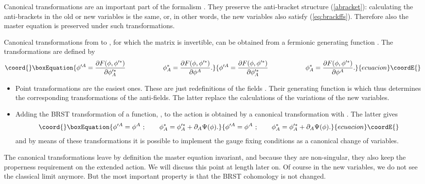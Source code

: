 \documentclass[a4paper,12pt]{article}
\begin{document}
Canonical transformations are an important part of the formalism
\cite{cano}.  They preserve the anti-bracket structure
(\ref{abracket}): calculating the anti-brackets in the old or new
variables is the same, or, in other words, the new variables also
satisfy (\ref{eq:brackffs}). Therefore also the master
equation \coordHE{} is preserved under such transformations.

Canonical transformations from \myHighlight{$\{\phi\, \phi ^*\}$}\coordHE{} to \coordHE{}, for which the matrix \coordHE{} is invertible, can be
obtained from a fermionic generating function \coordHE{}. The
transformations are defined by
\begin{equation}\coord{}\boxEquation{ \phi'^A=\frac{\partial F(\phi , \phi'^*)
}{\partial \phi'^*_A}\hspace{2cm}
\phi^*_A=\frac{\partial F(\phi , \phi'^*)}{\partial \phi ^A}.
\label{Fcan}}{ \phi'^A=\frac{\partial F(\phi , \phi'^*)
}{\partial \phi'^*_A}\hspace{2cm}
\phi^*_A=\frac{\partial F(\phi , \phi'^*)}{\partial \phi ^A}.
}{ecuacion}\coordE{}\end{equation}

\begin{itemize}
\item Point transformations are the easiest ones. These are just
  redefinitions of the fields \coordHE{}. Their generating
  function is \coordHE{} which thus determines the
  corresponding transformations of the anti-fields. The latter replace
  the calculations of the variations of the new variables.
\item Adding the BRST transformation of a function, \coordHE{}, to
  the action is obtained by a canonical transformation with \coordHE{}. The latter gives
\begin{equation}\coord{}\boxEquation{
\phi'^A = \phi^A \ ;\qquad
\phi ^*_A =\phi'^*_A + \partial _A \Psi (\phi ).
\label{gfermion}}{
\phi'^A = \phi^A \ ;\qquad
\phi ^*_A =\phi'^*_A + \partial _A \Psi (\phi ).
}{ecuacion}\coordE{}\end{equation}
and by means of these transformations it is possible to implement the
gauge fixing conditions as a canonical change of variables.
\end{itemize}
The canonical transformations leave by definition the master equation
invariant, and because they are non-singular, they also keep the
properness requirement on the extended action. We will discuss this
point at length later on. Of course in the new variables, we do not
see the classical limit anymore. But the most important property is
that the BRST cohomology \cite{anti_coho} is not changed.
\end{document}
